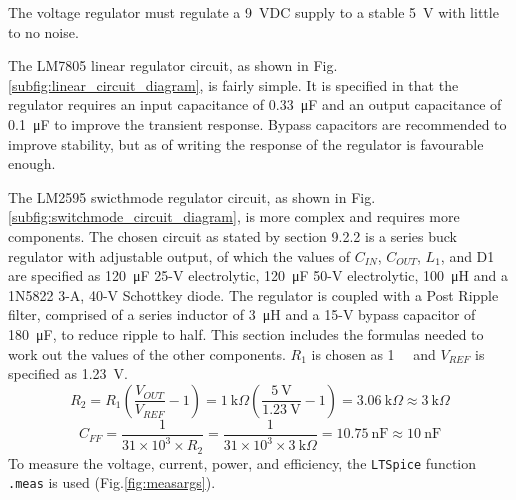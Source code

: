The voltage regulator must regulate a \SI{9}{VDC} supply to a stable \SI{5}{\volt} with little to no noise.\par
The LM7805 linear regulator circuit, as shown in Fig.\ref{subfig:linear_circuit_diagram}, is fairly simple. It is specified in \cite{LM7805} that the regulator requires an input capacitance of \SI{0.33}{\micro\F} and an output capacitance of \SI{0.1}{\micro\F} to improve the transient response. Bypass capacitors are recommended to improve stability, but as of writing the response of the regulator is favourable enough.\par
The LM2595 swicthmode regulator circuit, as shown in Fig.\ref{subfig:switchmode_circuit_diagram}, is more complex and requires more components. The chosen circuit as stated by \cite{LM2595} section 9.2.2 is a series buck regulator with adjustable output, of which the values of $C_{IN}$, $C_{OUT}$, $L_{1}$, and D1 are specified as \SI{120}{\micro\farad} 25-V electrolytic, \SI{120}{\micro\farad} 50-V electrolytic, \SI{100}{\micro\henry} and a 1N5822 3-A, 40-V Schottkey diode. The regulator is coupled with a Post Ripple filter, comprised of a series inductor of \SI{3}{\micro\henry} and a 15-V bypass capacitor of \SI{180}{\micro\farad}, to reduce ripple to half. This section includes the formulas needed to work out the values of the other components. $R_{1}$ is chosen as \SI{1}{\kilo\Omega} and $V_{REF}$ is specified as \SI{1.23}{\volt}.
\[
R_{2} = R_{1}(\frac{V_{OUT}}{V_{REF}}-1) =\SI{1}{\kilo\Omega}(\frac{\SI{5}{\volt}}{\SI{1.23}{\volt}}-1) = \SI{3.06}{\kilo\Omega} \approx  \SI{3}{\kilo\Omega}\]
\[C_{FF}=\frac{1}{31\times 10^3 \times R_2}= \frac{1}{31\times 10^3 \times \SI{3}{\kilo\Omega}}=\SI{10.75}{\nano\farad} \approx \SI{10}{\nano\farad}\]
\newline
To measure the voltage, current, power, and efficiency, the \texttt{LTSpice} function \texttt{.meas} is used (Fig.\ref{fig:measargs}).




